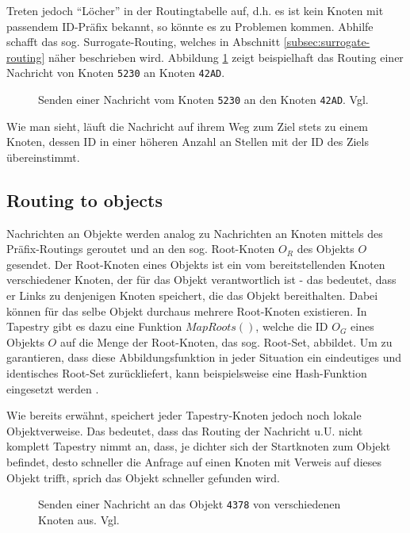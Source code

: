 Treten jedoch "`Löcher"' in der Routingtabelle auf, d.h. es ist kein Knoten mit
passendem ID-Präfix bekannt, so könnte es zu Problemen kommen. Abhilfe schafft
das sog. Surrogate-Routing, welches in Abschnitt \ref{subsec:surrogate-routing}
näher beschrieben wird. Abbildung \ref{fig:tapestry-route-node} zeigt
beispielhaft das Routing einer Nachricht von Knoten \texttt{5230} an Knoten
\texttt{42AD}. 

\begin{figure}
  \centering
  \def\JPicScale{0.55}
  
  \caption[Tapestry: Routing zu Knoten]{Senden einer Nachricht vom Knoten
  \texttt{5230} an den Knoten 
  \texttt{42AD}. Vgl. \cite[Fig. 2]{TapestryTR}}
  \label{fig:tapestry-route-node}
\end{figure}

Wie man sieht, läuft die Nachricht auf ihrem Weg zum Ziel stets zu einem 
Knoten, dessen ID in einer höheren Anzahl an Stellen mit der ID des Ziels 
übereinstimmt.

\subsection{Routing to objects}
Nachrichten an Objekte werden analog zu Nachrichten an Knoten mittels des 
Präfix-Routings geroutet und an den sog. Root-Knoten $O_R$ des Objekts $O$ 
gesendet. Der Root-Knoten eines Objekts ist ein vom bereitstellenden Knoten 
verschiedener Knoten, der für das Objekt verantwortlich ist - das bedeutet, 
dass er Links zu denjenigen Knoten speichert, die das Objekt bereithalten. 
Dabei können für das selbe Objekt durchaus mehrere Root-Knoten existieren. In 
Tapestry gibt es dazu eine Funktion $MapRoots()$, welche die ID $O_{G}$ eines 
Objekts $O$ auf die Menge der Root-Knoten, das sog. Root-Set, abbildet. Um zu 
garantieren, dass diese Abbildungsfunktion in jeder Situation ein eindeutiges 
und identisches Root-Set zurückliefert, kann beispielsweise eine Hash-Funktion 
eingesetzt werden \cite{HildrumKRZ02}.

Wie bereits erwähnt, speichert jeder Tapestry-Knoten jedoch noch lokale 
Objektverweise. Das bedeutet, dass das Routing der Nachricht u.U. nicht 
komplett Tapestry nimmt an, dass, je dichter sich der Startknoten zum Objekt 
befindet, desto schneller die Anfrage auf einen Knoten mit Verweis auf dieses 
Objekt trifft, sprich das Objekt schneller gefunden wird.

\begin{figure}
  \centering
  \def\JPicScale{0.59}
  
  \caption[Tapestry: Routing zu Objekt]{Senden einer Nachricht an das Objekt
  \texttt{4378} von verschiedenen Knoten aus. Vgl. \cite[Fig. 5]{TapestryTR}}
  \label{fig:tapestry-route-object}
\end{figure}

